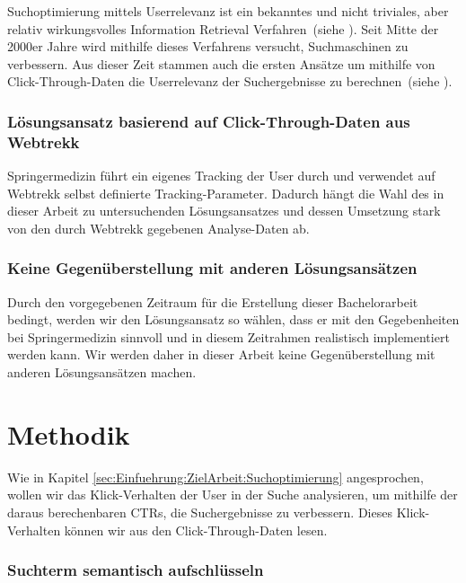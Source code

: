Suchoptimierung mittels Userrelevanz ist ein bekanntes und nicht triviales, aber relativ wirkungsvolles Information Retrieval Verfahren~(siehe \cite{IWUSBI}). Seit Mitte der 2000er Jahre wird mithilfe dieses Verfahrens versucht, Suchmaschinen zu verbessern. Aus dieser Zeit stammen auch die ersten Ansätze um mithilfe von Click-Through-Daten die Userrelevanz der Suchergebnisse zu berechnen~(siehe \cite{Joachims}).

\subsubsection{Lösungsansatz basierend auf Click-Through-Daten aus Webtrekk}
\label{sec:Einfuehrung:ZielArbeit:AbbildungSpringermedizinUmfeld:Loesungsansatz}

Springermedizin führt ein eigenes Tracking der User durch und verwendet auf Webtrekk selbst definierte Tracking-Parameter. Dadurch hängt die Wahl des in dieser Arbeit zu untersuchenden Lösungsansatzes und dessen Umsetzung stark von den durch Webtrekk gegebenen Analyse-Daten ab.

\subsubsection{Keine Gegenüberstellung mit anderen Lösungsansätzen}
\label{sec:Einfuehrung:ZielArbeit:AbbildungSpringermedizinUmfeld:NichtBehandeln}

Durch den vorgegebenen Zeitraum für die Erstellung dieser Bachelorarbeit bedingt, werden wir den Lösungsansatz so wählen, dass er mit den Gegebenheiten bei Springermedizin sinnvoll und in diesem Zeitrahmen realistisch implementiert werden kann. Wir werden daher in dieser Arbeit keine Gegenüberstellung mit anderen Lösungsansätzen machen. 


\section{Methodik}
\label{sec:Einfuehrung:Methodik}

Wie in Kapitel \ref{sec:Einfuehrung:ZielArbeit:Suchoptimierung} angesprochen, wollen wir das Klick-Verhalten der User in der Suche analysieren, um mithilfe der daraus berechenbaren CTRs, die Suchergebnisse zu verbessern. Dieses Klick-Verhalten können wir aus den Click-Through-Daten lesen. 

\subsubsection{Suchterm semantisch aufschlüsseln}
\label{sec:Einfuehrung:Methodik:SuchtermSegmentierung}

